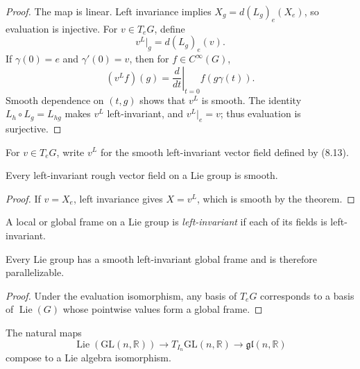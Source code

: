 \begin{proof}
\leanok
\sketch The map is linear. Left invariance implies
$X_g=d(L_g)_e(X_e)$, so evaluation is injective. For $v\in T_eG$, define
\[
v^L|_g=d(L_g)_e(v). \tag{8.13}
\]
If $\gamma(0)=e$ and $\gamma'(0)=v$, then for $f\in C^\infty(G)$,
\[
(v^Lf)(g)=\left.\frac{d}{dt}\right|_{t=0}f(g\gamma(t)).
\]
Smooth dependence on $(t,g)$ shows that $v^L$ is smooth. The identity
$L_h\circ L_g=L_{hg}$ makes $v^L$ left-invariant, and $v^L|_e=v$; thus
evaluation is surjective.
\end{proof}

\begin{notation}
\label{not:8-60-extra-6}
\mathlibok
For $v\in T_eG$, write $v^L$ for the smooth left-invariant vector field
defined by (8.13).
\end{notation}

\begin{corollary}
\label{cor:8-38}
\leanok
{}
Every left-invariant rough vector field on a Lie group is smooth.
\end{corollary}

\begin{proof}
\leanok
\sketch If $v=X_e$, left invariance gives $X=v^L$, which is smooth by the
theorem.
\end{proof}

\begin{definition}
\label{def:8-60-extra-7}
\leanok
A local or global frame on a Lie group is \emph{left-invariant} if each of its
fields is left-invariant.
\end{definition}

\begin{corollary}
\label{cor:8-39}
\leanok
{}
Every Lie group has a smooth left-invariant global frame and is therefore
parallelizable.
\end{corollary}

\begin{proof}
\leanok
\sketch Under the evaluation isomorphism, any basis of $T_eG$ corresponds to
a basis of $\operatorname{Lie}(G)$ whose pointwise values form a global frame.
\end{proof}

\begin{proposition}
\label{prop:8-41}
\leanok
{}
The natural maps
\[
\operatorname{Lie}(\mathrm{GL}(n,\mathbb{R}))
\longrightarrow T_{I_n}\mathrm{GL}(n,\mathbb{R})
\longrightarrow\mathfrak{gl}(n,\mathbb{R}) \tag{8.14}
\]
compose to a Lie algebra isomorphism.
\end{proposition}

